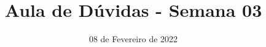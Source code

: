 \documentclass{beamer}
\title{Aula de Dúvidas - Semana 03}
\author[\autor]{\autor}
\institute[\instituto]{\instituto}
\date{08 de Fevereiro de 2022}
\begin{document}
    \begin{frame}
        \maketitle
    \end{frame}
\end{document}
